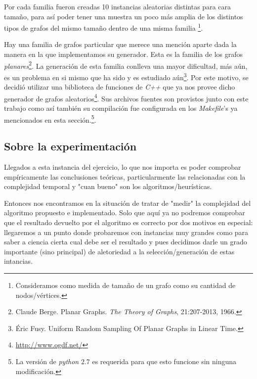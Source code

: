 \par Por cada familia fueron creadas 10 instancias aleatorias distintas para
    cara tama\~no, para as\'i poder tener una muestra un poco m\'as amplia 
    de los distintos tipos de grafos del mismo tama\~no dentro de una misma familia
    \footnote{Consideramos como medida de tama\~no de un grafo como su cantidad
    de nodos/v\'ertices.}.

\par Hay una familia de grafos particular que merece una menci\'on aparte dada
    la manera en la que implementamos su generador. Esta es la familia de los
    grafos \emph{planares}\footnote{Claude Berge. Planar Graphs. \emph{The Theory
    of Graphs}, 21:207-2013, 1966.}. La generaci\'on de esta familia conlleva
    una mayor dificultad, m\'as a\'un, es un problema en si mismo que ha sido
    y es estudiado a\'un\footnote{\'Eric Fusy. Uniform Random Sampling Of Planar
    Graphs in Linear Time.}. Por este motivo, se decidi\'o utilizar una
    biblioteca de funciones de \emph{C++} que ya nos provee dicho generador
    de grafos aleatorios\footnote{\url{http://www.ogdf.net/}}. Sus archivos
    fuentes son provistos junto con este trabajo como as\'i tambi\'en su
    compilaci\'on fue configurada en los \emph{Makefile}'s ya mencionados en
    esta secci\'on.\footnote{La versi\'on de \emph{python} 2.7 es requerida para
    que esto funcione sin ninguna modificaci\'on.}.

{}
\subsection*{Sobre la experimentaci\'on}
\par Llegados a esta instancia del ejercicio, lo que nos importa es poder
    comprobar emp\'iricamente las conclusiones te\'oricas, particularmente
    las relacionadas con la complejidad temporal y "cuan bueno" son los
    algoritmos/heur\'isticas.

\par Entonces nos encontramos en la situaci\'on de tratar de "medir"
    la complejidad del algoritmo propuesto e implementado. Solo que aqu\'i ya no podremos
    comprobar que el resultado devuelto por el algoritmo es correcto por dos
    motivos en especial: llegaremos a un punto donde probaremos con instancias
    muy grandes como para saber a ciencia cierta cual debe ser el resultado y
    pues decidimos darle un grado importante (sino principal) de aletoriedad
    a la selecci\'on/generaci\'on de estas intancias.

